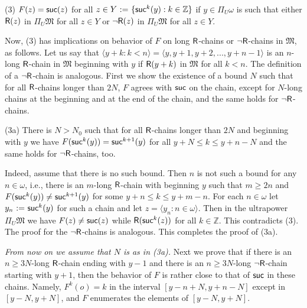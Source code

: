 \documentclass[12pt,leqno]{article}
\newcommand{\de}{\mbox{\ :=\ }}
\newcommand{\Mm}{\mbox{$\mathfrak M$}}
\newcommand{\R}{\mbox{\sf R}}
\newcommand{\Z}{\mathbb Z}
\newcommand{\suc}{\mbox{\sf suc}}
\begin{document}
\begin{description}\label{3}
	\item{(3)} $F(z)=\suc(z)$ for all $z\in Y\de\{\suc^k(y) : k\in\Z\}$ if $y\in\Pi_U\omega$ is such that either $\R(z)$ in $\Pi_U\Mm$ for all $z\in Y$ or $\lnot\R(z)$ in $\Pi_U\Mm$ for all $z\in Y$.
\end{description} 

\noindent
Now, (3) has implications on behavior of $F$ on long $\R$-chains or $\lnot\R$-chains in $\Mm$, as follows. Let us say that $\langle y+k : k<n\rangle = \langle y, y+1, y+2,...,y+n-1\rangle$ is an $n$-long $\R$-chain in $\Mm$ beginning with $y$ if $\R(y+k)$ in $\Mm$ for all $k<n$. The definition of a $\lnot\R$-chain is analogous. First we show the existence of a bound $N$ such that for all $\R$-chains longer than $2N$, $F$ agrees with $\suc$ on the chain, except for $N$-long chains at the beginning and at the end of the chain, and the same holds for $\lnot\R$-chains.
%
\begin{description}\label{3a}
	\item{(3a)} There is $N > N_0$ such that for all $\R$-chains longer than $2N$ and beginning with $y$ we have $F(\suc^k(y))=\suc^{k+1}(y)$ for all $y+N\le k\le y+n-N$ and the same holds for $\lnot\R$-chains, too.
\end{description} 
%
\indent Indeed, assume that there is no such bound. Then $n$ is not such a bound for any $n\in\omega$, i.e., there is an $m$-long $\R$-chain with beginning $y$ such that  $m\ge 2n$ and $F(\suc^{k}(y))\ne\suc^{k+1}(y)$ for some $y+n\le k\le y+m-n$. For each $n\in\omega$ let $y_{n}\de \suc^k(y)$ for such a chain and let $z=\langle y_{n}: n\in\omega\rangle$. Then in the ultrapower $\Pi_U\Mm$ we have $F(z)\ne\suc(z)$ while $\R(\suc^k(z))$ for all $k\in\Z$. This contradicts (3). The proof for the $\lnot\R$-chains is analogous. This completes the proof of (3a). 

\emph{From now on we assume that $N$ is as in (3a).} Next we prove that if there is an $n\ge 3N$-long $\R$-chain ending with $y-1$ and there is an $n\ge 3N$-long $\lnot\R$-chain starting with $y+1$, then the behavior of $F$ is rather close to that of $\suc$ in these chains. Namely, $F^k(o)=k$ in the interval $[y-n+N, y+n-N]$ except in $[y-N,y+N]$, and $F$ enumerates the elements of $[y-N,y+N]$. %
\end{document}
